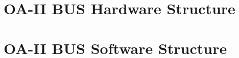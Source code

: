 \documentclass[12pt,article]{memoir}
\begin{document}
\chapter{OA-II BUS Hardware Structure}
\newpage
\chapter{OA-II BUS Software Structure}
\newpage
\end{document}
